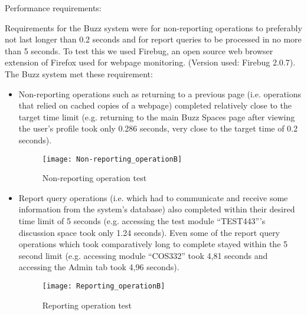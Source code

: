 \item Performance requirements:

Requirements for the Buzz system were for non-reporting operations to preferably not last longer than 0.2 seconds and for report queries to be processed in no more than 5 seconds.
To test this we used Firebug, an open source web browser extension of Firefox used for webpage monitoring. (Version used: Firebug 2.0.7).
The Buzz system met these requirement:
\begin{itemize}
\item Non-reporting operations such as returning to a previous page (i.e. operations that relied on cached copies of a webpage) completed relatively close to the target time limit (e.g. returning to the main Buzz Spaces page after viewing the user’s profile took only 0.286 seconds, very close to the target time of 0.2 seconds).

\begin{figure}[h!]
  \centering
    \texttt{[image: Non-reporting\_operationB]}
    \caption{Non-reporting operation test}
\end{figure}

\item Report query operations (i.e. which had to communicate and receive some information from the system’s database) also completed within their desired time limit of 5 seconds (e.g. accessing the test module “TEST443”’s discussion space took only 1.24 seconds). Even some of the report query operations which took comparatively long to complete stayed within the 5 second limit (e.g. accessing module “COS332” took 4,81 seconds and accessing the Admin tab took 4,96 seconds).

\begin{figure}[h!]
  \centering
    \texttt{[image: Reporting\_operationB]}
    \caption{Reporting operation test}
\end{figure}

\end{itemize}	
